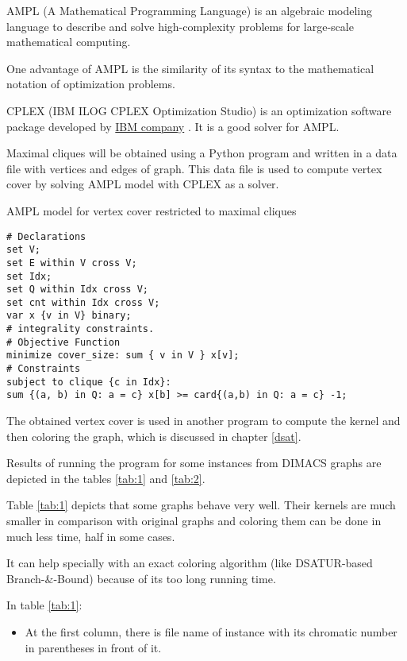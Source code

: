 \documentclass{beamer}
\begin{document}
{\begin{defi}
AMPL (A Mathematical Programming Language) is an algebraic modeling language to describe and solve high-complexity problems for large-scale mathematical computing. 

One advantage of AMPL is the similarity of its syntax to the mathematical notation of optimization problems.

CPLEX (IBM ILOG CPLEX Optimization Studio) is an optimization software package developed by \href{https://www.ibm.com/us-en/}{IBM company} \cite{IBM}. It is a good solver for AMPL.

Maximal cliques will be obtained using a Python program and written in a data file 
with vertices and edges of graph. This data file is used to compute vertex cover by solving AMPL model with CPLEX as a solver.



\newpage
AMPL model for vertex cover restricted to maximal cliques

\hline

\begin{verbatim}
# Declarations
set V;
set E within V cross V;
set Idx;
set Q within Idx cross V;
set cnt within Idx cross V;
var x {v in V} binary;
# integrality constraints.
# Objective Function
minimize cover_size: sum { v in V } x[v];
# Constraints
subject to clique {c in Idx}:
sum {(a, b) in Q: a = c} x[b] >= card{(a,b) in Q: a = c} -1;
\end{verbatim}

\newpage
The obtained vertex cover is used in another program to compute the
kernel and then coloring the graph, which is discussed in chapter \ref{dsat}.

Results of running the program for some instances from DIMACS graphs \cite{instance} are depicted in the tables \ref{tab:1} and \ref{tab:2}.

Table \ref{tab:1} depicts that some graphs behave very well. Their kernels are much smaller in comparison with original graphs and coloring them can be done in much less time, half in some cases. 

It can help specially with an exact coloring algorithm (like DSATUR-based Branch-$\&$-Bound) because of its too long running time.



In table \ref{tab:1}:

\begin{itemize}
\item At the first column, there is file name of instance with its chromatic number in parentheses in front of it.


\end{itemize}
\end{defi}}
\end{document}
